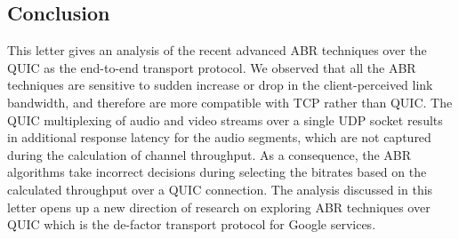 \subsection{Conclusion}
This letter gives an analysis of the recent advanced ABR techniques over the QUIC as the end-to-end transport protocol. We observed that all the ABR techniques are sensitive to sudden increase or drop in the client-perceived link bandwidth, and therefore are more compatible with TCP rather than QUIC. The QUIC multiplexing of audio and video streams over a single UDP socket results in additional response latency for the audio segments, which are not captured during the calculation of channel throughput. As a consequence, the ABR algorithms take incorrect decisions during selecting the bitrates based on the calculated throughput over a QUIC connection. The analysis discussed in this letter opens up a new direction of research on exploring ABR techniques over QUIC which is the de-factor transport protocol for Google services. 